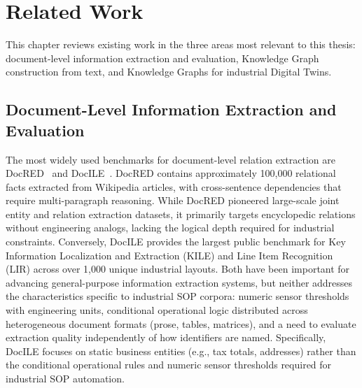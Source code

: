 ﻿\documentclass[11pt]{article}
\begin{document}
\section{Related Work}
\label{sec:related_work}

This chapter reviews existing work in the three areas most relevant to this
thesis: document-level information extraction and evaluation, Knowledge Graph
construction from text, and Knowledge Graphs for industrial Digital Twins.

\subsection{Document-Level Information Extraction and Evaluation}
\label{sec:rw_benchmarks}

The most widely used benchmarks for document-level relation extraction are
DocRED~\cite{yao2019docred} and DocILE~\cite{simsa2023docile}.
DocRED contains approximately 100,000 relational facts extracted from Wikipedia
articles, with cross-sentence dependencies that require multi-paragraph reasoning.
While DocRED pioneered large-scale joint entity and relation extraction datasets, it primarily targets encyclopedic relations without engineering analogs, lacking the logical depth required for industrial constraints.
Conversely, DocILE provides the largest public benchmark for Key Information Localization and Extraction (KILE) and Line Item Recognition (LIR) across over 1,000 unique industrial layouts.
Both have been important for advancing general-purpose information extraction
systems, but neither addresses the characteristics specific to industrial SOP
corpora: numeric sensor thresholds with engineering units, conditional operational
logic distributed across heterogeneous document formats (prose, tables, matrices),
and a need to evaluate extraction quality independently of how identifiers are
named.
Specifically, DocILE focuses on static business entities (e.g., tax totals, addresses) rather than the conditional operational rules and numeric sensor thresholds required for industrial SOP automation.
\end{document}
